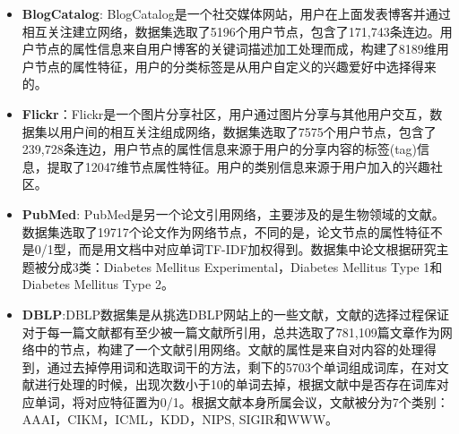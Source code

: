 \begin{itemize}
	\item \textbf{BlogCatalog}: BlogCatalog是一个社交媒体网站，用户在上面发表博客并通过相互关注建立网络，数据集选取了5196个用户节点，包含了171,743条连边。用户节点的属性信息来自用户博客的关键词描述加工处理而成，构建了8189维用户节点的属性特征，用户的分类标签是从用户自定义的兴趣爱好中选择得来的。
	
	\item \textbf{Flickr}：Flickr是一个图片分享社区，用户通过图片分享与其他用户交互，数据集以用户间的相互关注组成网络，数据集选取了7575个用户节点，包含了239,728条连边，用户节点的属性信息来源于用户的分享内容的标签(tag)信息，提取了12047维节点属性特征。用户的类别信息来源于用户加入的兴趣社区。
	
	
	
	\item \textbf{PubMed}: PubMed是另一个论文引用网络，主要涉及的是生物领域的文献。数据集选取了19717个论文作为网络节点，不同的是，论文节点的属性特征不是0/1型，而是用文档中对应单词TF-IDF加权得到。数据集中论文根据研究主题被分成3类：Diabetes Mellitus Experimental，Diabetes Mellitus Type 1和Diabetes Mellitus Type 2。
	
	\item \textbf{DBLP}:DBLP数据集是从挑选DBLP网站上的一些文献，文献的选择过程保证对于每一篇文献都有至少被一篇文献所引用，总共选取了781,109篇文章作为网络中的节点，构建了一个文献引用网络。文献的属性是来自对内容的处理得到，通过去掉停用词和选取词干的方法，剩下的5703个单词组成词库，在对文献进行处理的时候，出现次数小于10的单词去掉，根据文献中是否存在词库对应单词，将对应特征置为0/1。根据文献本身所属会议，文献被分为7个类别：AAAI，CIKM，ICML，KDD，NIPS, SIGIR和WWW。
	
\end{itemize}
